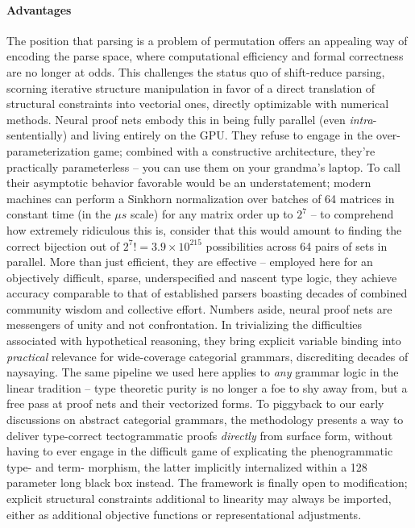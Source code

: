 \paragraph{Advantages}
The position that parsing is a problem of permutation offers an appealing way of encoding the parse space, where computational efficiency and formal correctness are no longer at odds.
This challenges the status quo of shift-reduce parsing, scorning iterative structure manipulation in favor of a direct translation of structural constraints into vectorial ones, directly optimizable with numerical methods.
Neural proof nets embody this in being fully parallel (even \textit{intra}-sententially) and living entirely on the GPU.
They refuse to engage in the over-parameterization game; combined with a constructive architecture, they're practically parameterless -- you can use them on your grandma's laptop.
To call their asymptotic behavior favorable would be an understatement; modern machines can perform a Sinkhorn normalization over batches of 64 matrices in constant time (in the $\mu s$ scale) for any matrix order up to $2^7$ -- to comprehend how extremely ridiculous this is, consider that this would amount to finding the correct bijection out of ${2^7}! = 3.9\times 10^{215}$ possibilities across 64 pairs of sets in parallel.
More than just efficient, they are effective -- employed here for an objectively difficult, sparse, underspecified and nascent type logic, they achieve accuracy comparable to that of established parsers boasting decades of combined community wisdom and collective effort.
Numbers aside, neural proof nets are messengers of unity and not confrontation.
In trivializing the difficulties associated with hypothetical reasoning, they bring explicit variable binding into \textit{practical} relevance for wide-coverage categorial grammars, discrediting decades of naysaying.
The same pipeline we used here applies to \textit{any} grammar logic in the linear tradition -- type theoretic purity is no longer a foe to shy away from, but a free pass at proof nets and their vectorized forms.
To piggyback to our early discussions on abstract categorial grammars, the methodology presents a way to deliver type-correct tectogrammatic proofs \textit{directly} from surface form, without having to ever engage in the difficult game of explicating the phenogrammatic type- and term- morphism, the latter implicitly internalized within a 128 parameter long black box instead.
The framework is finally open to modification; explicit structural constraints additional to linearity may always be imported, either as additional objective functions or representational adjustments.

